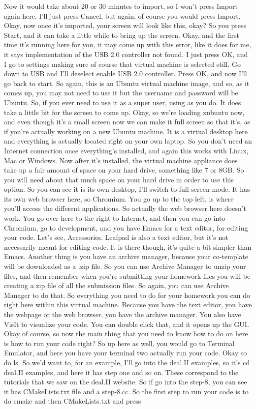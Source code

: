 \documentclass[10pt]{article}
\begin{document}
Now it would take about 20 or 30 minutes to import, so I won't press Import again here. I'll just press Cancel, but again, of course you would press Import. Okay, now once it's imported, your screen will look like this, okay? So you press Start, and it can take a little while to bring up the screen. Okay, and the first time it's running here for you, it may come up with this error, like it does for me, it says implementation of the USB 2.0 controller not found. I just press OK, and I go to settings making sure of course that virtual machine is selected still. Go down to USB and I'll deselect enable USB 2.0 controller. Press OK, and now I'll go back to start. So again, this is an Ubuntu virtual machine image, and so, as it comes up, you may not need to use it but the username and password will be Ubuntu. So, if you ever need to use it as a super user, using as you do. It does take a little bit for the screen to come up. Okay, so we're loading xubuntu now, and even though it's a small screen now we can make it full screen so that it's, as if you're actually working on a new Ubuntu machine. It is a virtual desktop here and everything is actually located right on your own laptop. So you don't need an Internet connection once everything's installed, and again this works with Linux, Mac or Windows. Now after it's installed, the virtual machine appliance does take up a fair amount of space on your hard drive, something like 7 or 8GB. So you will need about that much space on your hard drive in order to use this option. So you can see it is its own desktop, I'll switch to full screen mode. It has its own web browser here, so Chromium. You go up to the top left, is where you'll access the different applications. So actually the web browser here doesn't work. You go over here to the right to Internet, and then you can go into Chromium, go to development, and you have Emacs for a text editor, for editing your code. Let's see, Accessories. Leafpad is also a text editor, but it's not necessarily meant for editing code. It is there though, it's quite a bit simpler than Emacs. Another thing is you have an archive manager, because your co-template will be downloaded as a .zip file. So you can use Archive Manager to unzip your files, and then remember when you're submitting your homework files you will be creating a zip file of all the submission files. So again, you can use Archive Manager to do that. So everything you need to do for your homework you can do right here within this virtual machine. Because you have the text editor, you have the webpage or the web browser, you have the archive manager. You also have VisIt to visualize your code. You can double click that, and it opens up the GUI. Okay of course, so now the main thing that you need to know how to do on here is how to run your code right? So up here as well, you would go to Terminal Emulator, and here you have your terminal two actually run your code. Okay so do ls. So we'd want to, for an example, I'll go into the deal.II examples, so it's cd deal.II examples, and here it has step one and so on. These correspond to the tutorials that we saw on the deal.II website. So if go into the step-8, you can see it has CMakeLists.txt file and a step-8.cc. So the first step to run your code is to do cmake and then CMakeLists.txt and press 
\end{document}
